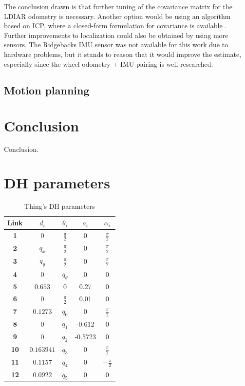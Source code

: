 \documentclass[times, utf8, diplomski, english]{fer}
\begin{document}
The conclusion drawn is that further tuning of the covariance matrix for the LDIAR odometry is necessary.
Another option would be using an algorithm based on ICP, where a closed-form formulation for covariance is available \citep{censi2007accurate}.
Further improvements to localization could also be obtained by using more sensors. 
The Ridgebacks IMU sensor was not available for this work due to hardware problems, but it stands to reason that it would improve the estimate, especially since the wheel odometry + IMU pairing is well researched.

\section{Motion planning}


\chapter{Conclusion}
Conclusion.




\appendix
\chapter{DH parameters}
\begin{table}
\caption{Thing's DH parameters}
 \begin{tabular}{@{}ccccc@{}}
  \toprule
 \textbf{Link}& $d_i$& $\theta_i$& $a_i$ & $\alpha_i$\\ \midrule \midrule
 \textbf{1} & $0$ & $\frac{\pi}{2}$ & $0$& $\frac{\pi}{2}$\\ \midrule
 \textbf{2} & $q_x$ & $\frac{\pi}{2}$ & $0$& $\frac{\pi}{2}$\\ \midrule
 \textbf{3} & $q_y$ & $\frac{\pi}{2}$ & $0$& $\frac{\pi}{2}$\\ \midrule
 \textbf{4} & $0$ &$q_{\theta}$ & 0& 0\\ \midrule
 \textbf{5} & $0.653$ & $0$ & 0.27& 0\\ \midrule
 \textbf{6} & $0$ & $\frac{\pi}{2}$ & 0.01& 0\\ \midrule
 \textbf{7} & $0.1273$ & $q_0$ & 0& $\frac{\pi}{2}$\\ \midrule
 \textbf{8} & $0$ & $q_1$ & -0.612& 0\\ \midrule
 \textbf{9} & $0$ & $q_2$ & -0.5723& 0\\ \midrule
 \textbf{10} & $ 0.163941$ & $q_3$ & 0& $\frac{\pi}{2}$\\ \midrule
 \textbf{11} & $0.1157$ & $q_4$ & 0& $-\frac{\pi}{2}$\\ \midrule
 \textbf{12} & $0.0922$ & $q_5$ & 0& 0\\ \bottomrule
 \end{tabular}
\label{DH}
\end{table}
\end{document}
